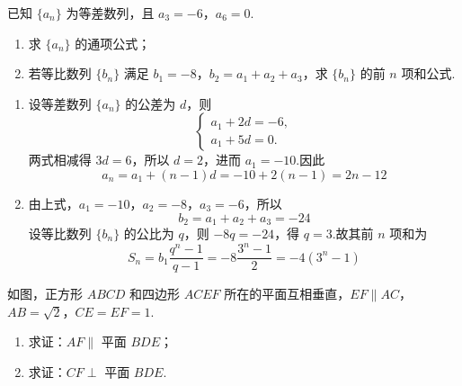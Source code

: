 \begin{problem}
已知 \(\{a_{n}\}\) 为等差数列，且 \(a_{3} = -6\)，\(a_{6} = 0\).

\begin{enumerate}
\item 求 \( \{a_{n}\} \) 的通项公式；
\item 若等比数列 \( \{b_{n}\} \) 满足 \(b_{1} = -8\)，\(b_{2} = a_{1} + a_{2} + a_{3}\)，求 \( \{b_{n}\} \) 的前 \(n\) 项和公式.
\end{enumerate}
\end{problem}

\begin{solution}
\begin{enumerate}
\item 设等差数列 \(\{a_n\}\) 的公差为 \(d\)，则
\[
\begin{cases}
a_1+2d=-6,\\
a_1+5d=0.
\end{cases}
\]
两式相减得 \(3d=6\)，所以 \(d=2\)，进而 \(a_1=-10\).因此
\[
a_n=a_1+(n-1)d=-10+2(n-1)=2n-12
\]

\item 由上式，\(a_1=-10\)，\(a_2=-8\)，\(a_3=-6\)，所以
\[
b_2=a_1+a_2+a_3=-24
\]
设等比数列 \(\{b_n\}\) 的公比为 \(q\)，则 \(-8q=-24\)，得 \(q=3\).故其前 \(n\) 项和为
\[
S_n=b_1\frac{q^n-1}{q-1}=-8\frac{3^n-1}{2}=-4(3^n-1)
\]
\end{enumerate}
\end{solution}

\begin{problem}
如图，正方形 \(ABCD\) 和四边形 \(ACEF\) 所在的平面互相垂直，\(EF \parallel AC\)，\(AB = \sqrt{2}\)，\(CE = EF = 1\).

\begin{enumerate}
\item 求证：\( AF \parallel \) 平面 \(BDE\)；
\item 求证：\( CF \perp \) 平面 \(BDE\).
\end{enumerate}

\end{problem}

